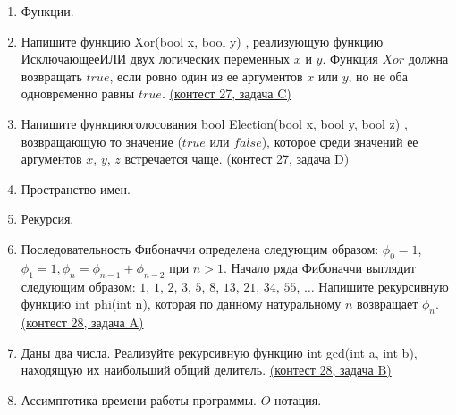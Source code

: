 \documentclass[a4paper,12pt]{article}
\begin{document}
\begin{enumerate}
\item Функции.
\item Напишите функцию Xor(bool x, bool y) {}, реализующую функцию $Исключающее ИЛИ$ двух логических переменных $x$ и $y$. Функция $Xor$ должна возвращать $true$, если ровно один из ее аргументов $x$ или $y$, но не оба одновременно равны $true$. \href{https://informatics.msk.ru/mod/statements/view3.php?chapterid=308}{(контест 27, задача C)}
\item Напишите $функцию голосования$ bool Election(bool x, bool y, bool z) {}, возвращающую то значение ($true$ или $false$), которое среди значений ее аргументов $x$, $y$, $z$ встречается чаще. \href{https://informatics.msk.ru/mod/statements/view3.php?chapterid=309}{(контест 27, задача D)}
\item Пространство имен.
\item Рекурсия.
\item Последовательность Фибоначчи определена следующим образом: $\phi_0=1$, $\phi_1=1, \phi_n=\phi_{n-1}+\phi_{n-2}$ при $n>1$. Начало ряда Фибоначчи выглядит следующим образом: $1$, $1$, $2$, $3$, $5$, $8$, $13$, $21$, $34$, $55$, $\dots$ Напишите рекурсивную функцию int phi(int n), которая по данному натуральному $n$ возвращает $\phi_n$. \href{https://informatics.msk.ru/mod/statements/view3.php?chapterid=312}{(контест 28, задача A)}
\item Даны два числа. Реализуйте рекурсивную функцию int gcd(int a, int b), находящую их наибольший общий делитель. \href{https://informatics.msk.ru/mod/statements/view3.php?chapterid=199}{(контест 28, задача B)}
\item Ассимптотика времени работы программы. $O$-нотация.
\end{enumerate}
\end{document}
